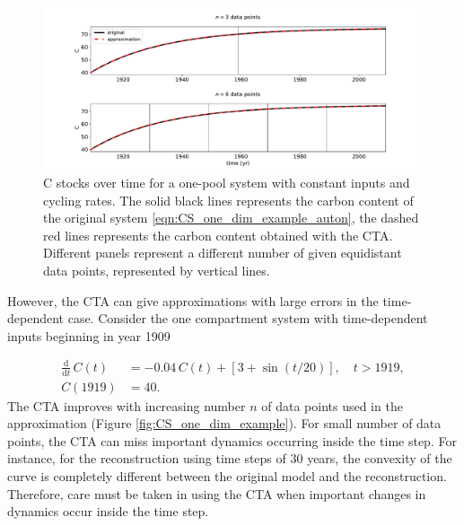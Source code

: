 \documentclass[draft]{agujournal2019}
\newcommand{\deriv}[1]{\frac{\mathrm{d}}{\mathrm{d}#1}}
\providecommand{\DIFaddbegin}{} %
\providecommand{\DIFaddend}{} %
\providecommand{\DIFdelbegin}{} %
\providecommand{\DIFdelend}{} %
\begin{document}
\begin{figure}[htbp]
    \centering 
    \includegraphics[width=1.0\linewidth]{figs/interpol_pwc_1_auton.pdf}
    \caption{C stocks over time for a one-pool system with constant inputs and cycling rates.
        The solid black lines represents the carbon content of the original system \eqref{eqn:CS_one_dim_example_auton}, the dashed red lines represents the carbon content obtained with the CTA.
        Different panels represent a different number of given equidistant data points, represented by vertical lines.
        }
    \label{fig:CS_one_dim_example_auton}
\end{figure}        

However, the CTA can give approximations with large errors in the time-dependent case. 
Consider the one compartment system with time-dependent inputs beginning in year 1909
\DIFaddbegin 

\DIFaddend \begin{equation}\label{eqn:CS_one_dim_example}
    \DIFdelbegin %
\DIFdelend \DIFaddbegin \begin{aligned}
        \deriv{t}\,C(t) &= -0.04\,C(t) + \left[3+\sin(t/20)\right],\quad t>1919,\\
        C(1919) &= 40.
    \end{aligned}
\DIFaddend \end{equation}
 The CTA improves with increasing number $n$ of data points used in the approximation (Figure \ref{fig:CS_one_dim_example}).
 For small number of data points, the CTA can miss important dynamics occurring inside the time step. For instance, for the reconstruction using time steps of 30 years, the convexity of the curve is completely different between the original model and the reconstruction. Therefore, care must be taken in using the CTA when important changes in dynamics occur inside the time step. 
\end{document}
